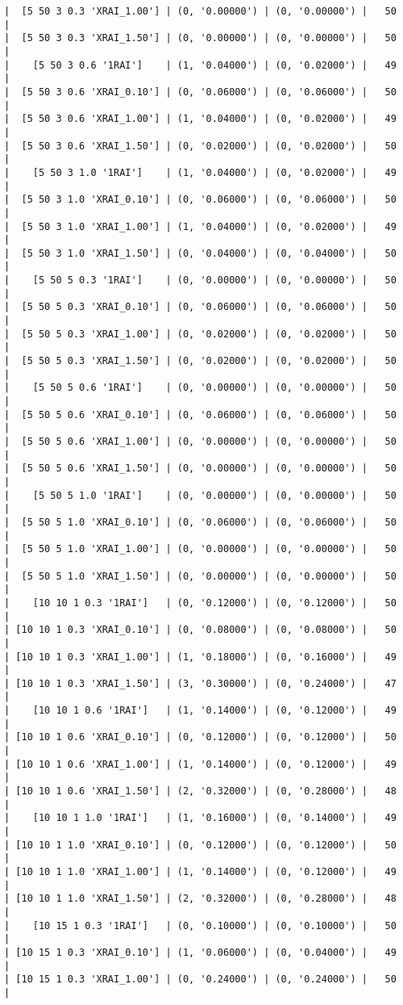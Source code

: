 \documentclass{article}
\begin{document}
\begin{verbatim}
|  [5 50 3 0.3 'XRAI_1.00'] | (0, '0.00000') | (0, '0.00000') |   50  |
|  [5 50 3 0.3 'XRAI_1.50'] | (0, '0.00000') | (0, '0.00000') |   50  |
|    [5 50 3 0.6 '1RAI']    | (1, '0.04000') | (0, '0.02000') |   49  |
|  [5 50 3 0.6 'XRAI_0.10'] | (0, '0.06000') | (0, '0.06000') |   50  |
|  [5 50 3 0.6 'XRAI_1.00'] | (1, '0.04000') | (0, '0.02000') |   49  |
|  [5 50 3 0.6 'XRAI_1.50'] | (0, '0.02000') | (0, '0.02000') |   50  |
|    [5 50 3 1.0 '1RAI']    | (1, '0.04000') | (0, '0.02000') |   49  |
|  [5 50 3 1.0 'XRAI_0.10'] | (0, '0.06000') | (0, '0.06000') |   50  |
|  [5 50 3 1.0 'XRAI_1.00'] | (1, '0.04000') | (0, '0.02000') |   49  |
|  [5 50 3 1.0 'XRAI_1.50'] | (0, '0.04000') | (0, '0.04000') |   50  |
|    [5 50 5 0.3 '1RAI']    | (0, '0.00000') | (0, '0.00000') |   50  |
|  [5 50 5 0.3 'XRAI_0.10'] | (0, '0.06000') | (0, '0.06000') |   50  |
|  [5 50 5 0.3 'XRAI_1.00'] | (0, '0.02000') | (0, '0.02000') |   50  |
|  [5 50 5 0.3 'XRAI_1.50'] | (0, '0.02000') | (0, '0.02000') |   50  |
|    [5 50 5 0.6 '1RAI']    | (0, '0.00000') | (0, '0.00000') |   50  |
|  [5 50 5 0.6 'XRAI_0.10'] | (0, '0.06000') | (0, '0.06000') |   50  |
|  [5 50 5 0.6 'XRAI_1.00'] | (0, '0.00000') | (0, '0.00000') |   50  |
|  [5 50 5 0.6 'XRAI_1.50'] | (0, '0.00000') | (0, '0.00000') |   50  |
|    [5 50 5 1.0 '1RAI']    | (0, '0.00000') | (0, '0.00000') |   50  |
|  [5 50 5 1.0 'XRAI_0.10'] | (0, '0.06000') | (0, '0.06000') |   50  |
|  [5 50 5 1.0 'XRAI_1.00'] | (0, '0.00000') | (0, '0.00000') |   50  |
|  [5 50 5 1.0 'XRAI_1.50'] | (0, '0.00000') | (0, '0.00000') |   50  |
|    [10 10 1 0.3 '1RAI']   | (0, '0.12000') | (0, '0.12000') |   50  |
| [10 10 1 0.3 'XRAI_0.10'] | (0, '0.08000') | (0, '0.08000') |   50  |
| [10 10 1 0.3 'XRAI_1.00'] | (1, '0.18000') | (0, '0.16000') |   49  |
| [10 10 1 0.3 'XRAI_1.50'] | (3, '0.30000') | (0, '0.24000') |   47  |
|    [10 10 1 0.6 '1RAI']   | (1, '0.14000') | (0, '0.12000') |   49  |
| [10 10 1 0.6 'XRAI_0.10'] | (0, '0.12000') | (0, '0.12000') |   50  |
| [10 10 1 0.6 'XRAI_1.00'] | (1, '0.14000') | (0, '0.12000') |   49  |
| [10 10 1 0.6 'XRAI_1.50'] | (2, '0.32000') | (0, '0.28000') |   48  |
|    [10 10 1 1.0 '1RAI']   | (1, '0.16000') | (0, '0.14000') |   49  |
| [10 10 1 1.0 'XRAI_0.10'] | (0, '0.12000') | (0, '0.12000') |   50  |
| [10 10 1 1.0 'XRAI_1.00'] | (1, '0.14000') | (0, '0.12000') |   49  |
| [10 10 1 1.0 'XRAI_1.50'] | (2, '0.32000') | (0, '0.28000') |   48  |
|    [10 15 1 0.3 '1RAI']   | (0, '0.10000') | (0, '0.10000') |   50  |
| [10 15 1 0.3 'XRAI_0.10'] | (1, '0.06000') | (0, '0.04000') |   49  |
| [10 15 1 0.3 'XRAI_1.00'] | (0, '0.24000') | (0, '0.24000') |   50  |

\end{verbatim}
\end{document}

